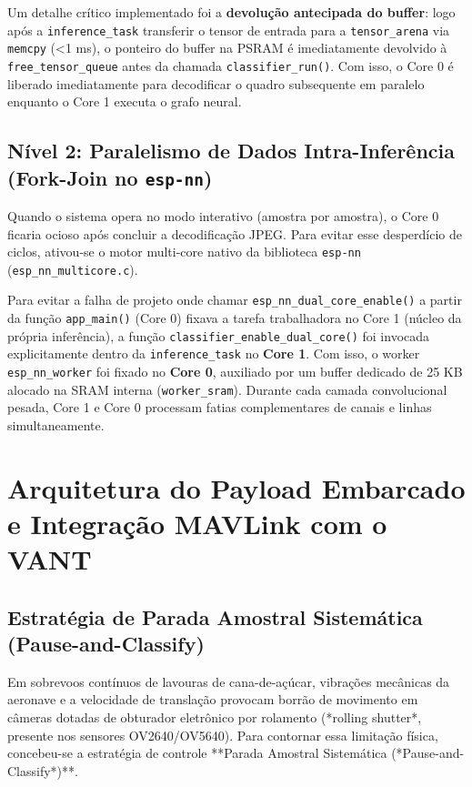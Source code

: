 Um detalhe crítico implementado foi a \textbf{devolução antecipada do buffer}: logo após a \texttt{inference\_task} transferir o tensor de entrada para a \texttt{tensor\_arena} via \texttt{memcpy} (<1 ms), o ponteiro do buffer na PSRAM é imediatamente devolvido à \texttt{free\_tensor\_queue} antes da chamada \texttt{classifier\_run()}. Com isso, o Core 0 é liberado imediatamente para decodificar o quadro subsequente em paralelo enquanto o Core 1 executa o grafo neural.

\subsection{Nível 2: Paralelismo de Dados Intra-Inferência (Fork-Join no \texttt{esp-nn})}

Quando o sistema opera no modo interativo (amostra por amostra), o Core 0 ficaria ocioso após concluir a decodificação JPEG. Para evitar esse desperdício de ciclos, ativou-se o motor multi-core nativo da biblioteca \texttt{esp-nn} (\texttt{esp\_nn\_multicore.c}).

Para evitar a falha de projeto onde chamar \texttt{esp\_nn\_dual\_core\_enable()} a partir da função \texttt{app\_main()} (Core 0) fixava a tarefa trabalhadora no Core 1 (núcleo da própria inferência), a função \texttt{classifier\_enable\_dual\_core()} foi invocada explicitamente dentro da \texttt{inference\_task} no \textbf{Core 1}. Com isso, o worker \texttt{esp\_nn\_worker} foi fixado no \textbf{Core 0}, auxiliado por um buffer dedicado de 25 KB alocado na SRAM interna (\texttt{worker\_sram}). Durante cada camada convolucional pesada, Core 1 e Core 0 processam fatias complementares de canais e linhas simultaneamente.

\section{Arquitetura do Payload Embarcado e Integração MAVLink com o VANT}

\subsection{Estratégia de Parada Amostral Sistemática (Pause-and-Classify)}

Em sobrevoos contínuos de lavouras de cana-de-açúcar, vibrações mecânicas da aeronave e a velocidade de translação provocam borrão de movimento em câmeras dotadas de obturador eletrônico por rolamento (*rolling shutter*, presente nos sensores OV2640/OV5640). Para contornar essa limitação física, concebeu-se a estratégia de controle **Parada Amostral Sistemática (*Pause-and-Classify*)**.

